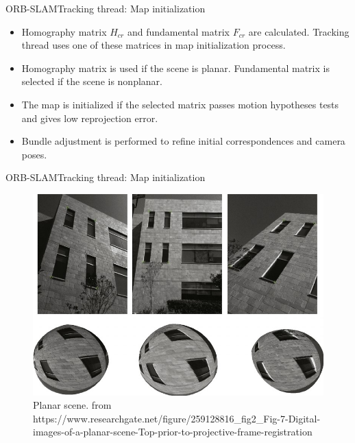 \documentclass{beamer}
\begin{document}
\begin{frame}{ORB-SLAM}{Tracking thread: Map initialization}

    \begin{itemize}
    \item{
   Homography matrix $H_{cr}$ and fundamental matrix $F_{cr}$ are calculated. Tracking thread uses one of these matrices in map initialization process. 
   }
   \item{
   Homography matrix is used if the scene is planar. Fundamental matrix is selected if the scene is nonplanar. 
   }
   \item{
   The map is initialized if the selected matrix passes motion hypotheses tests and gives low reprojection error.
   }
   \item{
      Bundle adjustment is performed to refine initial correspondences and camera poses.
   }
    \end{itemize}
\end{frame}

\begin{frame}{ORB-SLAM}{Tracking thread: Map initialization}
  \begin{figure}
\includegraphics[scale=0.35]{Figure/planar}
\caption{Planar scene. from https://www.researchgate.net/figure/259128816_fig2_Fig-7-Digital-images-of-a-planar-scene-Top-prior-to-projective-frame-registration}
\end{figure}
\end{frame}
\end{document}
